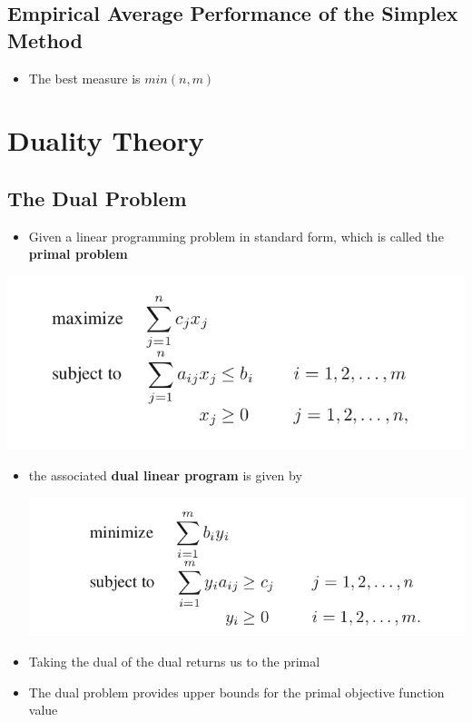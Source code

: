 \documentclass[11pt]{article}
\begin{document}
\subsection{Empirical Average Performance of the Simplex Method}
\label{sec:orgb07498a}
\begin{itemize}
\item The best measure is \(min(n,m)\)
\end{itemize}

\section{Duality Theory}
\label{sec:orge9edd23}
\subsection{The Dual Problem}
\label{sec:org7a714ba}
\begin{itemize}
\item Given a linear programming problem in standard form, which is called the \textbf{primal problem}
\end{itemize}
\begin{center}
\includegraphics[width=.9\linewidth]{Duality Theory/screenshot_2019-02-06_11-01-43.png}
\end{center}
\begin{itemize}
\item the associated \textbf{dual linear program} is given by
\begin{center}
\includegraphics[width=.9\linewidth]{Duality Theory/screenshot_2019-02-06_11-02-30.png}
\end{center}

\item Taking the dual of the dual returns us to the primal
\item The dual problem provides upper bounds for the primal objective function value
\end{itemize}
\end{document}
